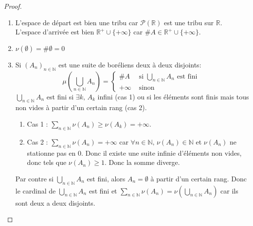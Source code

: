 \begin{proof}
	\begin{enumerate}
		\item L'espace de départ est bien une tribu car $\mathscr{P}(\mathbb{R})$ est une tribu sur $\mathbb{R}$.
		      L'espace d'arrivée est bien $\mathbb{R}^+ \cup \{+\infty\}$ car $\#A \in \mathbb{R}^+ \cup \{+\infty\}$.
		\item $\nu(\emptyset) = \#\emptyset = 0$
		\item Si $(A_n)_{n \in \mathbb{N}}$ est une suite de boréliens deux à deux disjoints:
		      \begin{equation*}
			      \mu(\bigcup\limits_{n \in \mathbb{N}} A_n) = \left\{\begin{array}{ll}
				      \#A     & \text{ si } \bigcup\limits_{n \in \mathbb{N}} A_n \text{ est fini } \\
				      +\infty & \text{ sinon }
			      \end{array}
			      \right.
		      \end{equation*}
		      $\bigcup\limits_{n \in \mathbb{N}} A_n$ est fini si $\exists k ,\, A_k$ infini (cas 1) ou si les éléments sont
		      finis mais tous non vides à partir d'un certain rang (cas 2).
		      \begin{enumerate}
			      \item Cas 1 : $\sum\limits_{n \in \mathbb{N}} \nu(A_n) \geq \nu(A_k) = +\infty$.
			      \item Cas 2 : $\sum\limits_{n \in \mathbb{N}} \nu(A_n) = +\infty$ car
			            $\forall n \in \mathbb{N}, \, \nu(A_n) \in \mathbb{N}$ et $\nu(A_n)$ ne stationne pas en 0. Donc il existe une suite
			            infinie d'éléments non vides, donc tels que $\nu(A_n) \geq 1$. Donc la somme diverge.
		      \end{enumerate}
		      Par contre si $\bigcup\limits_{n \in \mathbb{N}} A_n$ est fini, alors $A_n = \emptyset$ à partir d'un certain rang.
		      Donc le cardinal de $\bigcup\limits_{n \in \mathbb{N}} A_n$ est fini et $\sum\limits_{n \in \mathbb{N}} \nu(A_n) = \nu(\bigcup\limits_{n \in \mathbb{N}} A_n)$ car ils
		      sont deux a deux disjoints.
	\end{enumerate}
\end{proof}

